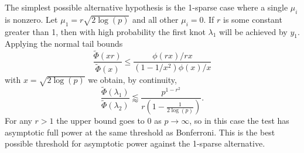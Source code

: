 \documentclass{imsart}
\begin{document}
The simplest possible alternative hypothesis
is the 1-sparse case where a single $\mu_i$ is nonzero. Let
$\mu_1 = r \sqrt{2\log(p)}$ and all other $\mu_i = 0$. If $r$ is some
constant greater than 1, then with high probability the first
knot $\lambda_1$ will be achieved by $y_1$. 
Applying the normal tail bounds
\[
\frac{\tilde \Phi(xr)}
{\tilde\Phi(x)} \leq \frac{\phi(rx)/rx}{(1-1/x^2)\phi(x)/x}
\]
with $x = \sqrt{2\log(p)}$ we obtain, by continuity,
\[
 \frac{\tilde \Phi(\lambda_1)}{\tilde \Phi(\lambda_2)}
\lessapprox \frac{p^{1-r^2}}{r\left(1-\frac{1}{2\log(p)}\right)}.
\]
For any $r > 1$ the upper bound goes to 0 as $p \to \infty$, so
in this case the test has asymptotic full power at the same threshold
as Bonferroni. This is the best possible threshold for asymptotic power
against the 1-sparse alternative.
\end{document}
